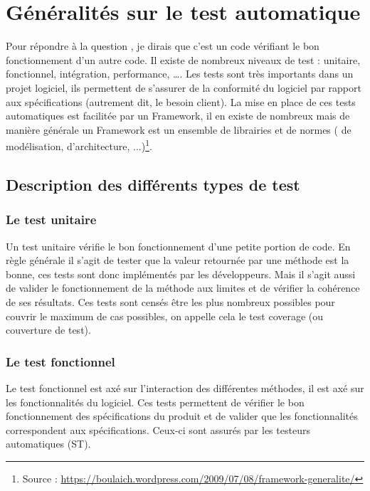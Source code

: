 
\section{G\'{e}n\'{e}ralit\'{e}s sur le test automatique}

Pour r\'{e}pondre \`{a} la question , je dirais que c'est un code v\'{e}rifiant le bon fonctionnement d'un autre code. Il existe de nombreux niveaux de test : unitaire, fonctionnel, int\'{e}gration, performance, \ldots. Les tests sont tr\`{e}s importants dans un projet logiciel, ils permettent de s'assurer de la conformit\'{e} du logiciel par rapport aux sp\'{e}cifications (autrement dit, le besoin client). La mise en place de ces tests automatiques est facilit\'{e}e par un Framework, il en existe de nombreux mais de mani\`{e}re g\'{e}n\'{e}rale un Framework est un ensemble de librairies et de normes ( de mod\'{e}lisation, d'architecture, ...)\footnote{Source : \url{https://boulaich.wordpress.com/2009/07/08/framework-generalite/}}. \\
\subsection{Description des diff\'{e}rents types de test}



\subsubsection{Le test unitaire}
Un test unitaire v\'{e}rifie le bon fonctionnement d'une petite portion de code. En r\`{e}gle g\'{e}n\'{e}rale il s'agit de tester que la valeur retourn\'{e}e par une m\'{e}thode est la bonne, ces tests sont donc impl\'{e}ment\'{e}s par les d\'{e}veloppeurs. Mais il s'agit aussi de valider le fonctionnement de la m\'{e}thode aux limites et de v\'{e}rifier la coh\'{e}rence de ses r\'{e}sultats. Ces tests sont cens\'{e}s \^{e}tre les plus nombreux possibles pour couvrir le maximum de cas possibles, on appelle cela le test coverage (ou couverture de test).

\subsubsection{Le test fonctionnel}
Le test fonctionnel est ax\'{e} sur l'interaction des diff\'{e}rentes m\'{e}thodes, il est ax\'{e} sur les fonctionnalit\'{e}s du logiciel. Ces tests permettent de v\'{e}rifier le bon fonctionnement des sp\'{e}cifications du produit et de valider que les fonctionnalit\'{e}s correspondent aux sp\'{e}cifications. Ceux-ci sont assur\'{e}s par les testeurs automatiques (ST).

